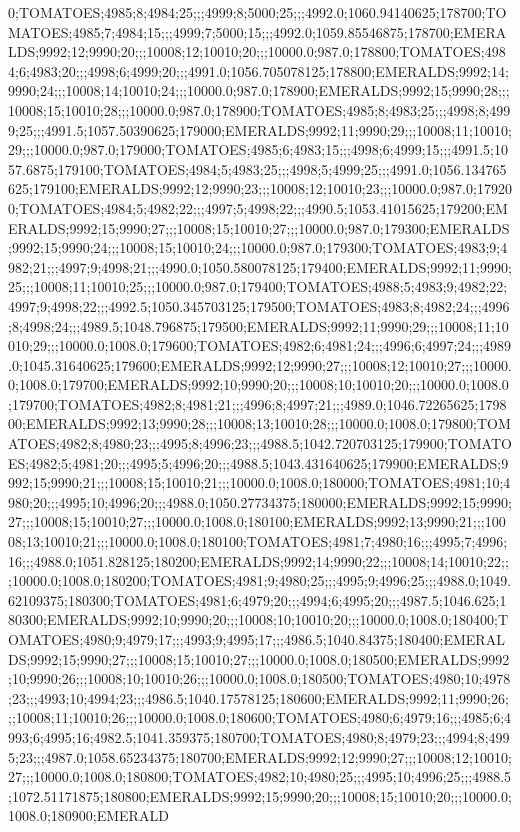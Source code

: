 0;TOMATOES;4985;8;4984;25;;;4999;8;5000;25;;;4992.0;1060.94140625;178700;TOMATOES;4985;7;4984;15;;;4999;7;5000;15;;;4992.0;1059.85546875;178700;EMERALDS;9992;12;9990;20;;;10008;12;10010;20;;;10000.0;987.0;178800;TOMATOES;4984;6;4983;20;;;4998;6;4999;20;;;4991.0;1056.705078125;178800;EMERALDS;9992;14;9990;24;;;10008;14;10010;24;;;10000.0;987.0;178900;EMERALDS;9992;15;9990;28;;;10008;15;10010;28;;;10000.0;987.0;178900;TOMATOES;4985;8;4983;25;;;4998;8;4999;25;;;4991.5;1057.50390625;179000;EMERALDS;9992;11;9990;29;;;10008;11;10010;29;;;10000.0;987.0;179000;TOMATOES;4985;6;4983;15;;;4998;6;4999;15;;;4991.5;1057.6875;179100;TOMATOES;4984;5;4983;25;;;4998;5;4999;25;;;4991.0;1056.134765625;179100;EMERALDS;9992;12;9990;23;;;10008;12;10010;23;;;10000.0;987.0;179200;TOMATOES;4984;5;4982;22;;;4997;5;4998;22;;;4990.5;1053.41015625;179200;EMERALDS;9992;15;9990;27;;;10008;15;10010;27;;;10000.0;987.0;179300;EMERALDS;9992;15;9990;24;;;10008;15;10010;24;;;10000.0;987.0;179300;TOMATOES;4983;9;4982;21;;;4997;9;4998;21;;;4990.0;1050.580078125;179400;EMERALDS;9992;11;9990;25;;;10008;11;10010;25;;;10000.0;987.0;179400;TOMATOES;4988;5;4983;9;4982;22;4997;9;4998;22;;;4992.5;1050.345703125;179500;TOMATOES;4983;8;4982;24;;;4996;8;4998;24;;;4989.5;1048.796875;179500;EMERALDS;9992;11;9990;29;;;10008;11;10010;29;;;10000.0;1008.0;179600;TOMATOES;4982;6;4981;24;;;4996;6;4997;24;;;4989.0;1045.31640625;179600;EMERALDS;9992;12;9990;27;;;10008;12;10010;27;;;10000.0;1008.0;179700;EMERALDS;9992;10;9990;20;;;10008;10;10010;20;;;10000.0;1008.0;179700;TOMATOES;4982;8;4981;21;;;4996;8;4997;21;;;4989.0;1046.72265625;179800;EMERALDS;9992;13;9990;28;;;10008;13;10010;28;;;10000.0;1008.0;179800;TOMATOES;4982;8;4980;23;;;4995;8;4996;23;;;4988.5;1042.720703125;179900;TOMATOES;4982;5;4981;20;;;4995;5;4996;20;;;4988.5;1043.431640625;179900;EMERALDS;9992;15;9990;21;;;10008;15;10010;21;;;10000.0;1008.0;180000;TOMATOES;4981;10;4980;20;;;4995;10;4996;20;;;4988.0;1050.27734375;180000;EMERALDS;9992;15;9990;27;;;10008;15;10010;27;;;10000.0;1008.0;180100;EMERALDS;9992;13;9990;21;;;10008;13;10010;21;;;10000.0;1008.0;180100;TOMATOES;4981;7;4980;16;;;4995;7;4996;16;;;4988.0;1051.828125;180200;EMERALDS;9992;14;9990;22;;;10008;14;10010;22;;;10000.0;1008.0;180200;TOMATOES;4981;9;4980;25;;;4995;9;4996;25;;;4988.0;1049.62109375;180300;TOMATOES;4981;6;4979;20;;;4994;6;4995;20;;;4987.5;1046.625;180300;EMERALDS;9992;10;9990;20;;;10008;10;10010;20;;;10000.0;1008.0;180400;TOMATOES;4980;9;4979;17;;;4993;9;4995;17;;;4986.5;1040.84375;180400;EMERALDS;9992;15;9990;27;;;10008;15;10010;27;;;10000.0;1008.0;180500;EMERALDS;9992;10;9990;26;;;10008;10;10010;26;;;10000.0;1008.0;180500;TOMATOES;4980;10;4978;23;;;4993;10;4994;23;;;4986.5;1040.17578125;180600;EMERALDS;9992;11;9990;26;;;10008;11;10010;26;;;10000.0;1008.0;180600;TOMATOES;4980;6;4979;16;;;4985;6;4993;6;4995;16;4982.5;1041.359375;180700;TOMATOES;4980;8;4979;23;;;4994;8;4995;23;;;4987.0;1058.65234375;180700;EMERALDS;9992;12;9990;27;;;10008;12;10010;27;;;10000.0;1008.0;180800;TOMATOES;4982;10;4980;25;;;4995;10;4996;25;;;4988.5;1072.51171875;180800;EMERALDS;9992;15;9990;20;;;10008;15;10010;20;;;10000.0;1008.0;180900;EMERALD